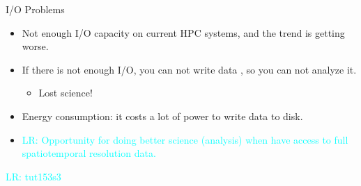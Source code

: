 \documentclass[compress,11pt,xcolor=svgnames,aspectratio=169]{beamer}
\newcommand{\lr}[1]{\textcolor{cyan}{LR: #1}}
\begin{document}
\begin{frame}[t]{I/O Problems}

\begin{itemize}
\setlength\itemsep{0.7cm}

\item Not enough I/O capacity on current HPC systems, and the trend is getting worse.

\item If there is not enough I/O, you can not write data%
, so you can not analyze it.
    \begin{itemize}
        \item Lost science!
    \end{itemize}

\item Energy consumption: it costs a lot of power to write data to disk.

\item \lr{Opportunity for doing better science (analysis) when have access to full spatiotemporal resolution data.}

\end{itemize}

\begin{center}
\end{center}

\lr{tut153s3}

\end{frame}
\end{document}
